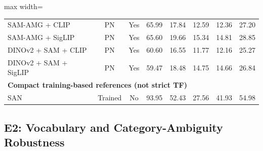 \documentclass[11pt,a4paper]{article}
\begin{document}
\begin{table}[H]
\begin{adjustbox}{max width=\textwidth}
\begin{tabular}{l c c c c c c c}
SAM-AMG + CLIP & PN & Yes & 65.99 & 17.84 & 12.59 & 12.36 & 27.20 \\
SAM-AMG + SigLIP & PN & Yes & 65.60 & 19.66 & 15.34 & 14.81 & 28.85 \\
DINOv2 + SAM + CLIP & PN & Yes & 60.60 & 16.55 & 11.77 & 12.16 & 25.27 \\
DINOv2 + SAM + SigLIP & PN & Yes & 59.47 & 18.48 & 14.75 & 14.66 & 26.84 \\
\midrule
\multicolumn{8}{l}{\textbf{Compact training-based references (not strict TF)}} \\
SAN & Trained & No & 93.95 & 52.43 & 27.56 & 41.93 & 54.98 \\
\bottomrule
\end{tabular}
\end{adjustbox}
\end{table}

\subsection{E2: Vocabulary and Category-Ambiguity Robustness}
\end{document}

